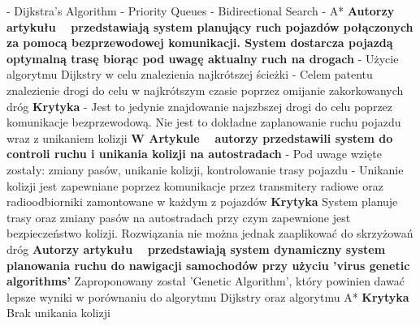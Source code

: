   - Dijkstra's Algorithm
  \newline
  - Priority Queues
  \newline
  - Bidirectional Search
  \newline
  - A*
  \newline
\newline
\newline
\textbf{Autorzy artykułu ~\cite{gazis1997optimal} przedstawiają system planujący ruch pojazdów połączonych za pomocą bezprzewodowej komunikacji. System dostarcza pojazdą optymalną trasę biorąc pod uwagę aktualny ruch na drogach}
\newline
- Użycie algorytmu Dijkstry w celu znalezienia najkrótszej ścieżki
\newline
- Celem patentu znalezienie drogi do celu w najkrótszym czasie poprzez omijanie zakorkowanych dróg
\newline
\newline
\textbf{Krytyka}
\newline
- Jest to jedynie znajdowanie najszbszej drogi do celu poprzez komunikacje bezprzewodową. Nie jest to dokładne zaplanowanie ruchu pojazdu wraz z unikaniem kolizji
\newline
\newline
\textbf{W Artykule ~\cite{broxmeyer1994vehicle} autorzy przedstawili system do controli ruchu i unikania kolizji na autostradach}
\newline
- Pod uwage wzięte zostały: zmiany pasów, unikanie kolizji, kontrolowanie trasy pojazdu
\newline
- Unikanie kolizji jest zapewniane poprzez komunikacje przez transmitery radiowe oraz radioodbiorniki zamontowane w każdym z pojazdów
\newline
\newline
\textbf{Krytyka}
\newline
System planuje trasy oraz zmiany pasów na autostradach przy czym zapewnione jest bezpieczeństwo kolizji. Rozwiązania nie można jednak zaaplikować do skrzyżowań dróg
\newline
\newline
\textbf{Autorzy artykułu ~\cite{kanoh2007dynamic} przedstawiają system dynamiczny system planowania ruchu do nawigacji samochodów przy użyciu 'virus genetic algorithms'}
\newline
Zaproponowany został 'Genetic Algorithm', który powinien dawać lepsze wyniki w porównaniu do algorytmu Dijkstry oraz algorytmu A*
\newline
\newline
\textbf{Krytyka}
\newline
Brak unikania kolizji

